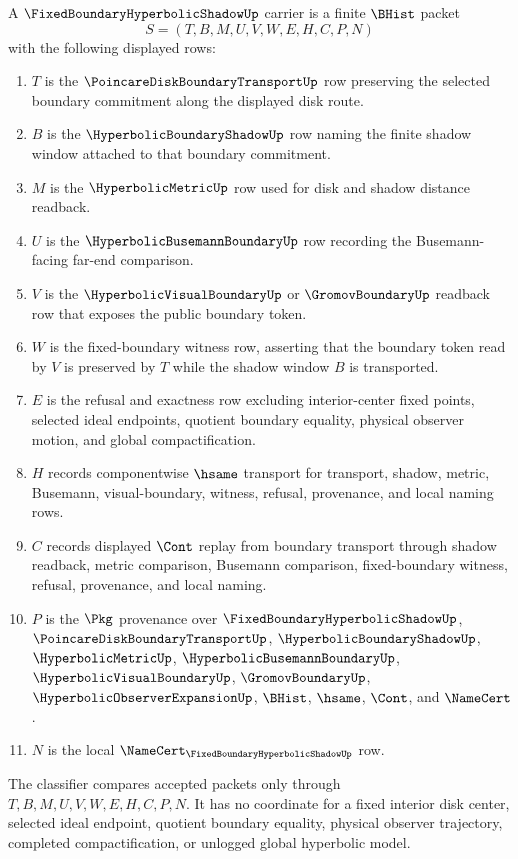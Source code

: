 \begin{definition}
\label{def:fixed-boundary-hyperbolic-shadow-carrier}
A $\FixedBoundaryHyperbolicShadowUp$ carrier is a finite $\BHist$ packet
$$
S=(T,B,M,U,V,W,E,H,C,P,N)
$$
with the following displayed rows:
\begin{enumerate}
\item $T$ is the $\PoincareDiskBoundaryTransportUp$ row preserving the selected boundary commitment along the displayed disk route.
\item $B$ is the $\HyperbolicBoundaryShadowUp$ row naming the finite shadow window attached to that boundary commitment.
\item $M$ is the $\HyperbolicMetricUp$ row used for disk and shadow distance readback.
\item $U$ is the $\HyperbolicBusemannBoundaryUp$ row recording the Busemann-facing far-end comparison.
\item $V$ is the $\HyperbolicVisualBoundaryUp$ or $\GromovBoundaryUp$ readback row that exposes the public boundary token.
\item $W$ is the fixed-boundary witness row, asserting that the boundary token read by $V$ is preserved by $T$ while the shadow window $B$ is transported.
\item $E$ is the refusal and exactness row excluding interior-center fixed points, selected ideal endpoints, quotient boundary equality, physical observer motion, and global compactification.
\item $H$ records componentwise $\hsame$ transport for transport, shadow, metric, Busemann, visual-boundary, witness, refusal, provenance, and local naming rows.
\item $C$ records displayed $\Cont$ replay from boundary transport through shadow readback, metric comparison, Busemann comparison, fixed-boundary witness, refusal, provenance, and local naming.
\item $P$ is the $\Pkg$ provenance over $\FixedBoundaryHyperbolicShadowUp$, $\PoincareDiskBoundaryTransportUp$, $\HyperbolicBoundaryShadowUp$, $\HyperbolicMetricUp$, $\HyperbolicBusemannBoundaryUp$, $\HyperbolicVisualBoundaryUp$, $\GromovBoundaryUp$, $\HyperbolicObserverExpansionUp$, $\BHist$, $\hsame$, $\Cont$, and $\NameCert$.
\item $N$ is the local $\NameCert_{\FixedBoundaryHyperbolicShadowUp}$ row.
\end{enumerate}
The classifier compares accepted packets only through $T,B,M,U,V,W,E,H,C,P,N$. It has no coordinate for a fixed interior disk center, selected ideal endpoint, quotient boundary equality, physical observer trajectory, completed compactification, or unlogged global hyperbolic model.
\end{definition}

